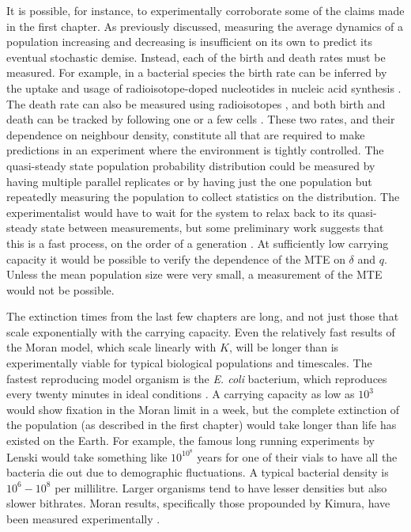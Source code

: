 It is possible, for instance, to experimentally corroborate some of the claims made in the first chapter. %
As previously discussed, measuring the average dynamics of a population increasing and decreasing is insufficient on its own to predict its eventual stochastic demise. 
Instead, each of the birth and death rates must be measured. 
For example, in a bacterial species the birth rate can be inferred by the uptake and usage of radioisotope-doped nucleotides in nucleic acid synthesis \cite{Kirchman1982}. 
The death rate can also be measured using radioisotopes \cite{Servais1985}, and both birth and death can be tracked by following one or a few cells \cite{Wheeler2003,Groisman2005,Wang2010,Lee2012,Grunberger2014}. %
These two rates, and their dependence on neighbour density, constitute all that are required to make predictions in an experiment where the environment is tightly controlled. 
The quasi-steady state population probability distribution could be measured by having multiple parallel replicates or by having just the one population but repeatedly measuring the population to collect statistics on the distribution. 
The experimentalist would have to wait for the system to relax back to its quasi-steady state between measurements, but some preliminary work suggests that this is a fast process, on the order of a generation \cite{Badali2020}. 
At sufficiently low carrying capacity it would be possible to verify the dependence of the MTE on $\delta$ and $q$. 
Unless the mean population size were very small, a measurement of the MTE would not be possible. 

The extinction times from the last few chapters are long, and not just those that scale exponentially with the carrying capacity. 
Even the relatively fast results of the Moran model, which scale linearly with $K$, will be longer than is experimentally viable for typical biological populations and timescales. 
The fastest reproducing model organism is the \emph{E. coli} bacterium, which reproduces every twenty minutes in ideal conditions \cite{Lenski1991,???}. 
A carrying capacity as low as $10^3$ would show fixation in the Moran limit in a week, but the complete extinction of the population (as described in the first chapter) would take longer than life has existed on the Earth. %
For example, the famous long running experiments by Lenski \cite{Lenski1991} would take something like $10^{10^8}$ years for one of their vials to have all the bacteria die out due to demographic fluctuations. 
A typical bacterial density is $10^6 - 10^8$ per millilitre. Larger organisms tend to have lesser densities but also slower bithrates. 
Moran results, specifically those propounded by Kimura, have been measured experimentally \cite{Kimura1980,Kimura1983}. 

